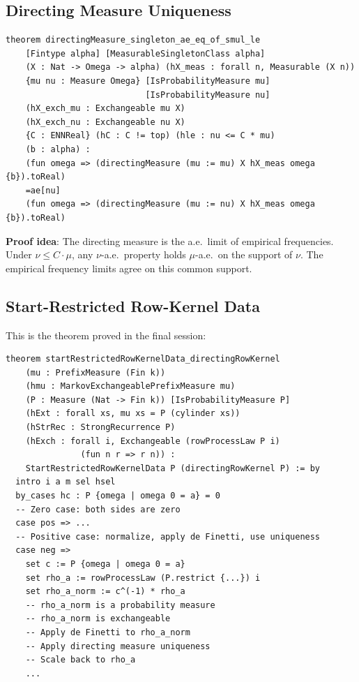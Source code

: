 \documentclass[11pt,a4paper]{article}
\theoremstyle{definition}
\begin{document}
\subsection{Directing Measure Uniqueness}

\begin{lstlisting}
theorem directingMeasure_singleton_ae_eq_of_smul_le
    [Fintype alpha] [MeasurableSingletonClass alpha]
    (X : Nat -> Omega -> alpha) (hX_meas : forall n, Measurable (X n))
    {mu nu : Measure Omega} [IsProbabilityMeasure mu]
                            [IsProbabilityMeasure nu]
    (hX_exch_mu : Exchangeable mu X)
    (hX_exch_nu : Exchangeable nu X)
    {C : ENNReal} (hC : C != top) (hle : nu <= C * mu)
    (b : alpha) :
    (fun omega => (directingMeasure (mu := mu) X hX_meas omega {b}).toReal)
    =ae[nu]
    (fun omega => (directingMeasure (mu := nu) X hX_meas omega {b}).toReal)
\end{lstlisting}

\textbf{Proof idea}: The directing measure is the a.e.\ limit of empirical
frequencies. Under $\nu \leq C \cdot \mu$, any $\nu$-a.e.\ property holds
$\mu$-a.e.\ on the support of $\nu$. The empirical frequency limits agree
on this common support.

\subsection{Start-Restricted Row-Kernel Data}

This is the theorem proved in the final session:

\begin{lstlisting}
theorem startRestrictedRowKernelData_directingRowKernel
    (mu : PrefixMeasure (Fin k))
    (hmu : MarkovExchangeablePrefixMeasure mu)
    (P : Measure (Nat -> Fin k)) [IsProbabilityMeasure P]
    (hExt : forall xs, mu xs = P (cylinder xs))
    (hStrRec : StrongRecurrence P)
    (hExch : forall i, Exchangeable (rowProcessLaw P i)
               (fun n r => r n)) :
    StartRestrictedRowKernelData P (directingRowKernel P) := by
  intro i a m sel hsel
  by_cases hc : P {omega | omega 0 = a} = 0
  -- Zero case: both sides are zero
  case pos => ...
  -- Positive case: normalize, apply de Finetti, use uniqueness
  case neg =>
    set c := P {omega | omega 0 = a}
    set rho_a := rowProcessLaw (P.restrict {...}) i
    set rho_a_norm := c^(-1) * rho_a
    -- rho_a_norm is a probability measure
    -- rho_a_norm is exchangeable
    -- Apply de Finetti to rho_a_norm
    -- Apply directing measure uniqueness
    -- Scale back to rho_a
    ...
\end{lstlisting}
\end{document}
